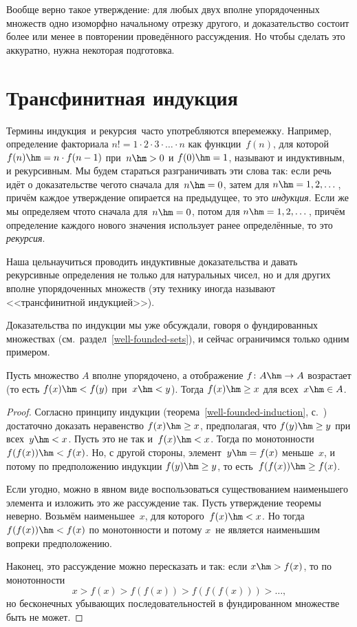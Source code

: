 Вообще верно такое утверждение: для любых двух вполне
упорядоченных множеств одно изоморфно начальному отрезку
другого, и доказательство состоит более или менее в повторении
проведённого рассуждения. Но чтобы сделать это аккуратно, нужна
некоторая подготовка.

\section{Трансфинитная индукция}
        \label{transfinite-recursion}

Термины  индукция\ и  рекурсия\ часто употребляются
вперемежку. Например, определение факториала
$n!=1\cdot2\cdot3\cdot\ldots\cdot n$ как функции~$f(n)$, для
которой $f(n)\hm=n\cdot f(n-1)$ при~$n\hm>0$ и $f(0)\hm=1$,
называют и  индуктивным, и  рекурсивным. Мы будем
стараться разграничивать эти слова так: если речь идёт о
доказательстве чего\д то сначала для~$n\hm=0$, затем для
$n\hm=1,2,\dots$, причём каждое утверждение опирается на
предыдущее, то это \emph{индукция}. Если же мы определяем что\д то
сначала для~$n\hm=0$, потом для $n\hm=1,2,\dots$, причём
определение каждого нового значения использует ранее
определённые, то это \emph{рекурсия}.

Наша цель\т научиться проводить индуктивные доказательства и
давать рекурсивные определения не только для натуральных чисел, но и для других вполне упорядоченных множеств (эту технику иногда называют <<трансфинитной индукцией>>).

Доказательства по индукции мы уже обсуждали, говоря о
фундированных множествах (см.~раздел~\ref{well-founded-sets}), и
сейчас ограничимся только одним примером.

\begin{theorem}\label{monotone-mappings-wosets}
Пусть множество $A$ вполне упорядочено, а отображение $f\colon
A\hm\to A$ возрастает (то есть $f(x)\hm<f(y)$ при~$x\hm<y$).
Тогда $f(x)\hm\ge x$ для всех~$x\hm\in A$.
\end{theorem}

\begin{proof}
Согласно принципу индукции (теорема~\ref{well-founded-induction},
с.~\pageref{well-founded-induction})
достаточно доказать неравенство $f(x)\hm\ge x$, предполагая, что
$f(y)\hm\ge y$ при всех~$y\hm<x$. Пусть это не так и~$f(x)\hm<x$. Тогда
по монотонности~$f(f(x))\hm<f(x)$. Но, с другой стороны, элемент~$y\hm=f(x)$
меньше~$x$, и потому по предположению индукции $f(y)\hm\ge y$, то
есть~$f(f(x))\hm\ge f(x)$.

Если угодно, можно в явном виде воспользоваться существованием
наименьшего элемента и изложить это же рассуждение так. Пусть
утверждение теоремы неверно. Возьмём наименьшее~$x$, для
которого~$f(x)\hm<x$. Но тогда $f(f(x))\hm<f(x)$ по монотонности и
потому $x$~не является наименьшим вопреки предположению.

Наконец, это рассуждение можно пересказать и так:
если $x\hm>f(x)$, то по монотонности
        $$
x > f(x) > f(f(x)) > f(f(f(x))) > \ldots,
        $$
но бесконечных убывающих последовательностей в фундированном
множестве быть не может.
\end{proof}

